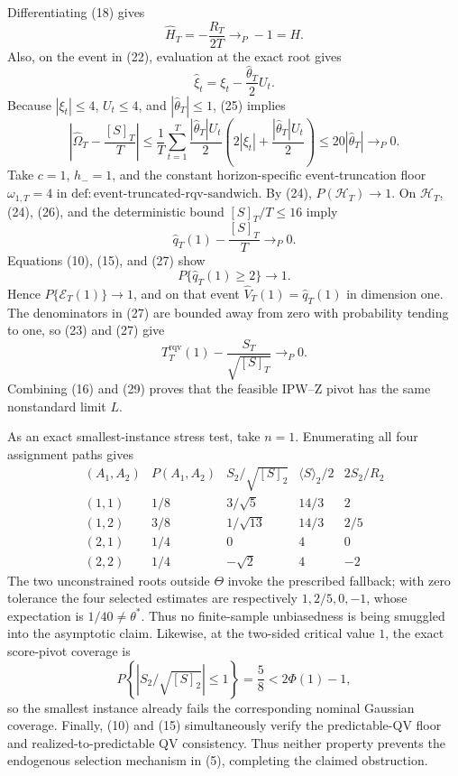 Differentiating (18) gives
\[
 \widehat H_T=-\frac{R_T}{2T}\to_P-1=H.
\tag{24}
\]
Also, on the event in (22), evaluation at the exact root gives
\[
 \widehat\xi_t=\xi_t-\frac{\widehat\theta_T}{2}U_t.
\tag{25}
\]
Because \(|\xi_t|\le4\), \(U_t\le4\), and \(|\widehat\theta_T|\le1\), (25) implies
\[
 \left|\widehat\Omega_T-\frac{[S]_T}{T}\right|
 \le\frac1T\sum_{t=1}^T
 \frac{|\widehat\theta_T|U_t}{2}
 \left(2|\xi_t|+\frac{|\widehat\theta_T|U_t}{2}\right)
 \le20|\widehat\theta_T|
 \to_P0.
\tag{26}
\]
Take \(c=1\), \(h_-=1\), and the constant horizon-specific event-truncation floor \(\omega_{1,T}=4\) in \(\mathrm{def:event\text{-}truncated\text{-}rqv\text{-}sandwich}\). By (24), \(P(\mathcal H_T)\to1\). On \(\mathcal H_T\), (24), (26), and the deterministic bound \([S]_T/T\le16\) imply
\[
 \widehat q_T(1)-\frac{[S]_T}{T}\to_P0.
\tag{27}
\]
Equations (10), (15), and (27) show
\[
 P\{\widehat q_T(1)\ge2\}\longrightarrow1.
\tag{28}
\]
Hence \(P\{\mathcal E_T(1)\}\to1\), and on that event \(\widehat V_T(1)=\widehat q_T(1)\) in dimension one. The denominators in (27) are bounded away from zero with probability tending to one, so (23) and (27) give
\[
 T_T^{\mathrm{rqv}}(1)
 -\frac{S_T}{\sqrt{[S]_T}}
 \to_P0.
\tag{29}
\]
Combining (16) and (29) proves that the feasible IPW--Z pivot has the same nonstandard limit \(L\).

As an exact smallest-instance stress test, take \(n=1\). Enumerating all four assignment paths gives
\[
\begin{array}{c|c|c|c|c}
(A_1,A_2)&P(A_1,A_2)&S_2/\sqrt{[S]_2}&\langle S\rangle_2/2&2S_2/R_2\\ \hline
(1,1)&1/8&3/\sqrt5&14/3&2\\
(1,2)&3/8&1/\sqrt{13}&14/3&2/5\\
(2,1)&1/4&0&4&0\\
(2,2)&1/4&-\sqrt2&4&-2
\end{array}
\tag{30}
\]
The two unconstrained roots outside \(\Theta\) invoke the prescribed fallback; with zero tolerance the four selected estimates are respectively \(1,2/5,0,-1\), whose expectation is \(1/40\ne\theta^*\). Thus no finite-sample unbiasedness is being smuggled into the asymptotic claim. Likewise, at the two-sided critical value \(1\), the exact score-pivot coverage is
\[
 P\!\left\{\left|S_2/\sqrt{[S]_2}\right|\le1\right\}=\frac58
 <2\Phi(1)-1,
\tag{31}
\]
so the smallest instance already fails the corresponding nominal Gaussian coverage. Finally, (10) and (15) simultaneously verify the predictable-QV floor and realized-to-predictable QV consistency. Thus neither property prevents the endogenous selection mechanism in (5), completing the claimed obstruction.
